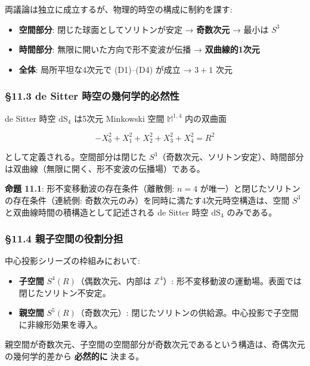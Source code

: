 \documentclass[
  a4paper,11pt]{ltjsarticle}
\providecommand{\tightlist}{%
  \setlength{\itemsep}{0pt}\setlength{\parskip}{0pt}}
\theoremstyle{definition}
\theoremstyle{remark}
\begin{document}
両議論は独立に成立するが、物理的時空の構成に制約を課す:

\begin{itemize}
\tightlist
\item
  \textbf{空間部分}: 閉じた球面としてソリトンが安定 → \textbf{奇数次元}
  → 最小は \(S^3\)
\item
  \textbf{時間部分}: 無限に開いた方向で形不変波が伝播 →
  \textbf{双曲線的1次元}
\item
  \textbf{全体}: 局所平坦な4次元で (D1)--(D4) が成立 → \(3 + 1\) 次元
\end{itemize}

\subsubsection{§11.3 de Sitter
時空の幾何学的必然性}\label{de-sitter-ux6642ux7a7aux306eux5e7eux4f55ux5b66ux7684ux5fc5ux7136ux6027}

de Sitter 時空 \(\mathrm{dS}_4\) は5次元 Minkowski 空間
\(\mathbb{M}^{1,4}\) 内の双曲面

\[-X_0^2 + X_1^2 + X_2^2 + X_3^2 + X_4^2 = R^2\]

として定義される。空間部分は閉じた
\(S^3\)（奇数次元、ソリトン安定）、時間部分は双曲線（無限に開く、形不変波の伝播場）である。

\textbf{命題 11.1}: 形不変移動波の存在条件（離散側: \(n = 4\)
が唯一）と閉じたソリトンの存在条件（連続側:
奇数次元のみ）を同時に満たす4次元時空構造は、空間 \(S^3\)
と双曲線時間の積構造として記述される de Sitter 時空 \(\mathrm{dS}_4\)
のみである。

\subsubsection{§11.4
親子空間の役割分担}\label{ux89aaux5b50ux7a7aux9593ux306eux5f79ux5272ux5206ux62c5}

中心投影シリーズの枠組みにおいて:

\begin{itemize}
\tightlist
\item
  \textbf{子空間} \(S^4(R)\)（偶数次元、内部は \(\mathbb{Z}^4\)）:
  形不変移動波の運動場。表面では閉じたソリトン不安定。
\item
  \textbf{親空間} \(S^5(R)\)（奇数次元）:
  閉じたソリトンの供給源。中心投影で子空間に非線形効果を導入。
\end{itemize}

親空間が奇数次元、子空間の空間部分が奇数次元であるという構造は、奇偶次元の幾何学的差から
\textbf{必然的に} 決まる。
\end{document}
